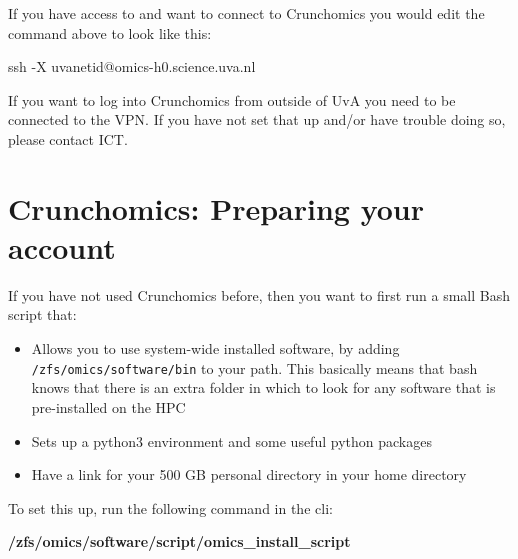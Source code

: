 \documentclass[
  letterpaper,
  DIV=11,
  numbers=noendperiod]{scrreprt}
\newenvironment{Shaded}{}{}
\newcommand{\AttributeTok}[1]{\textcolor[rgb]{0.84,0.23,0.29}{#1}}
\newcommand{\ExtensionTok}[1]{\textcolor[rgb]{0.84,0.23,0.29}{\textbf{#1}}}
\newcommand{\FunctionTok}[1]{\textcolor[rgb]{0.44,0.26,0.76}{#1}}
\newcommand{\NormalTok}[1]{\textcolor[rgb]{0.14,0.16,0.18}{#1}}
\providecommand{\tightlist}{%
  \setlength{\itemsep}{0pt}\setlength{\parskip}{0pt}}\usepackage{longtable,booktabs,array}
\begin{document}
If you have access to and want to connect to Crunchomics you would edit
the command above to look like this:

\begin{Shaded}
\begin{Highlighting}[]
\FunctionTok{ssh} \AttributeTok{{-}X}\NormalTok{ uvanetid@omics{-}h0.science.uva.nl}
\end{Highlighting}
\end{Shaded}

\begin{tcolorbox}[enhanced jigsaw, arc=.35mm, left=2mm, breakable, colbacktitle=quarto-callout-important-color!10!white, bottomrule=.15mm, title=\textcolor{quarto-callout-important-color}{\faExclamation}\hspace{0.5em}{Important}, leftrule=.75mm, colback=white, opacitybacktitle=0.6, opacityback=0, coltitle=black, colframe=quarto-callout-important-color-frame, toprule=.15mm, bottomtitle=1mm, toptitle=1mm, titlerule=0mm, rightrule=.15mm]

If you want to log into Crunchomics from outside of UvA you need to be
connected to the VPN. If you have not set that up and/or have trouble
doing so, please contact ICT.

\end{tcolorbox}

\section{Crunchomics: Preparing your
account}\label{crunchomics-preparing-your-account}

If you have not used Crunchomics before, then you want to first run a
small Bash script that:

\begin{itemize}
\tightlist
\item
  Allows you to use system-wide installed software, by adding
  \texttt{/zfs/omics/software/bin} to your path. This basically means
  that bash knows that there is an extra folder in which to look for any
  software that is pre-installed on the HPC
\item
  Sets up a python3 environment and some useful python packages
\item
  Have a link for your 500 GB personal directory in your home directory
\end{itemize}

To set this up, run the following command in the cli:

\begin{Shaded}
\begin{Highlighting}[]
\ExtensionTok{/zfs/omics/software/script/omics\_install\_script}
\end{Highlighting}
\end{Shaded}
\end{document}
